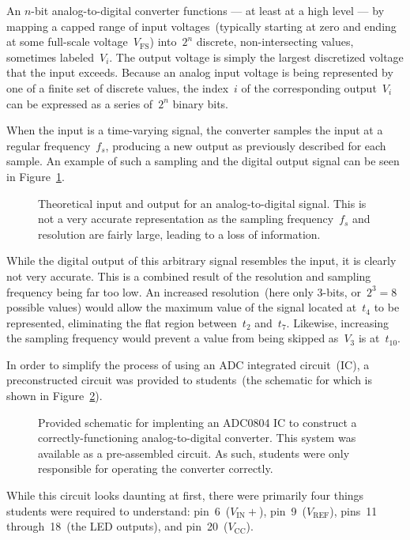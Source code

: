 An $n$-bit analog-to-digital converter functions --- at least at a high level
--- by mapping a capped range of input voltages~(typically starting at zero and
ending at some full-scale voltage~$V_\text{FS}$) into~$2^n$ discrete,
non-intersecting values, sometimes labeled~$V_i$.  The output voltage is simply
the largest discretized voltage that the input exceeds.  Because an analog
input voltage is being represented by one of a finite set of discrete values,
the index~$i$ of the corresponding output~$V_i$ can be expressed as a series
of~$2^n$ binary bits.

When the input is a time-varying signal, the converter samples the input
at a regular frequency~$f_s$, producing a new output as previously described
for each sample.  An example of such a sampling and the digital output signal
can be seen in Figure~\ref{fig:theory}.
%
\begin{figure}[H]
	\centering

	\parbox{.8\textwidth}{
	\caption[Theory Plots]{Theoretical input and output for an
	analog-to-digital signal.  This is not a very accurate representation as
	the sampling frequency~$f_s$ and resolution are fairly large, leading to a
	loss of information.}
	\label{fig:theory}}
\end{figure}
%
While the digital output of this arbitrary signal resembles the input, it is
clearly not very accurate.  This is a combined result of the resolution and
sampling frequency being far too low.  An increased resolution~(here only
3-bits, or~$2^3 = 8$ possible values) would allow the maximum value of the
signal located at~$t_4$ to be represented, eliminating the flat region
between~$t_2$ and~$t_7$.  Likewise, increasing the sampling frequency would
prevent a value from being skipped as~$V_3$ is at~$t_{10}$.

In order to simplify the process of using an ADC integrated circuit~(IC), a
preconstructed circuit was provided to students~(the schematic for which is
shown in Figure~\ref{fig:adcSchem}).
%
\begin{figure}[H]
	\centering
	
	\parbox{.8\textwidth}{
	\caption[ADC Schematic]{Provided schematic for implenting an ADC0804 IC to
	construct a correctly-functioning analog-to-digital converter.  This system
	was available as a pre-assembled circuit.  As such, students were only
	responsible for operating the converter correctly.}
	\label{fig:adcSchem}}
\end{figure}
%
While this circuit looks daunting at first, there were primarily four things
students were required to understand:  pin~6~($V_\text{IN}+$),
pin~9~($V_\text{REF}$), pins~11 through~18~(the LED outputs), and
pin~20~($V_\text{CC}$).


